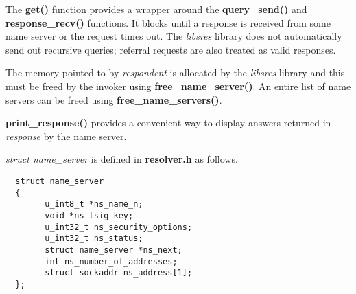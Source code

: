 The {\bf get()} function provides a wrapper around the {\bf query\_send()} and
{\bf response\_recv()} functions.  It blocks until a response is received from
some name server or the request times out.  The {\it libsres} library does
not automatically send out recursive queries; referral requests are also
treated as valid responses.

The memory pointed to by {\it *respondent} is allocated by the {\it libsres}
library and this must be freed by the invoker using {\bf free\_name\_server()}.
An entire list of name servers can be freed using {\bf free\_name\_servers()}.

{\bf print\_response()} provides a convenient way to display answers returned
in {\it response} by the name server.

{\it struct name\_server} is defined in {\bf resolver.h} as follows.

\begin{verbatim}
  struct name_server
  {
        u_int8_t *ns_name_n;
        void *ns_tsig_key;
        u_int32_t ns_security_options;
        u_int32_t ns_status;
        struct name_server *ns_next;
        int ns_number_of_addresses;
        struct sockaddr ns_address[1];
  };
\end{verbatim}


